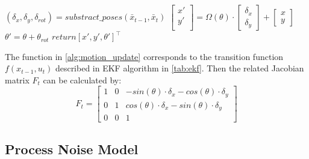 \begin{algorithm}                      
  \caption{\transfunc ($x_{t-1}$, $u_t$)}         %
  \label{alg:motion_update}                           
  \begin{algorithmic}[1]                    
    \State $(\delta_{x}, \delta_{y}, \delta_{rot}) = substract\_poses (\bar{x}_{t-1}, \bar{x}_{t})$
    \State $
    \begin{bmatrix}
      x'\\ 
      y'\\ 
    \end{bmatrix}
    = 
    \Omega(\theta)
    \cdot 
    \begin{bmatrix}
      \delta_{x}\\ 
      \delta_{y} 
    \end{bmatrix} +
    \begin{bmatrix}
      x\\ 
      y 
    \end{bmatrix}\
    $
    \State $\theta' = \theta + \theta_{rot}$ 
    \State $return [x', y', \theta']^\top$
  \end{algorithmic}
\end{algorithm}

The function \textit{\transfunc} in \autoref{alg:motion_update} corresponds to the transition function $f(x_{t-1}, u_{t})$ described in \gls{EKF} algorithm in \autoref{tab:ekf}. Then the related Jacobian matrix $F_t$ can be calculated by:
\begin{equation}\label{eq:jacobianF} 
F_t = 
\begin{bmatrix}
1 & 0 & -sin(\theta)\cdot \delta_x - cos(\theta)\cdot\delta_y\\ 
0 &  1& cos(\theta)\cdot \delta_x  - sin(\theta)\cdot\delta_y\\ 
0 & 0 & 1
\end{bmatrix} 
\end{equation}

\subsection{Process Noise Model}
\label{sub:Process Noise Model}

